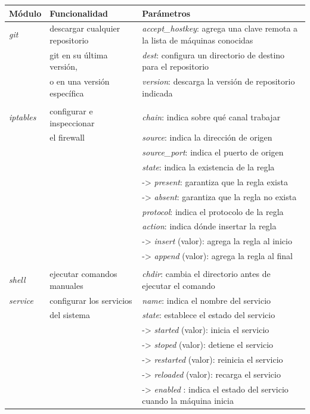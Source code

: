 \documentclass[a4paper,12pt]{article}
\begin{document}
{\begin{center}
\begin{tabulary}{\textwidth}{l|l|L}
\hline
Módulo & Funcionalidad & Parámetros\\
\hline
\emph{git} & descargar cualquier repositorio & \emph{accept\_hostkey}: agrega una clave remota a la lista de máquinas conocidas\\
 & git en su última versión, & \emph{dest}: configura un directorio de destino para el repositorio\\
 & o en una versión específica & \emph{version}: descarga la versión de repositorio indicada\\
 &  & \\
\hline
\emph{iptables} & configurar e inspeccionar & \emph{chain}: indica sobre qué canal trabajar\\
 & el firewall & \emph{source}: indica la dirección de origen\\
 &  & \emph{source\_port}: indica el puerto de origen\\
 &  & \emph{state}: indica la existencia de la regla\\
 &  & -> \emph{present}: garantiza que la regla exista\\
 &  & -> \emph{absent}: garantiza que la regla no exista\\
 &  & \emph{protocol}: indica el protocolo de la regla\\
 &  & \emph{action}: indica dónde insertar la regla\\
 &  & -> \emph{insert} (valor): agrega la regla al inicio\\
 &  & -> \emph{append} (valor): agrega la regla al final\\
 &  & \\
\hline
\emph{shell} & ejecutar comandos manuales & \emph{chdir}: cambia el directorio antes de ejecutar el comando\\
\hline
\emph{service} & configurar los servicios & \emph{name}: indica el nombre del servicio\\
 & del sistema & \emph{state}: establece el estado del servicio\\
 &  & -> \emph{started} (valor): inicia el servicio\\
 &  & -> \emph{stoped} (valor): detiene el servicio\\
 &  & -> \emph{restarted} (valor): reinicia el servicio\\
 &  & -> \emph{reloaded} (valor): recarga el servicio\\
 &  & -> \emph{enabled} : indica el estado del servicio cuando la máquina inicia\\

\end{tabulary}
\end{center}}
\end{document}

